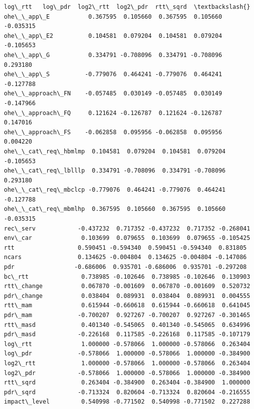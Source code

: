 \documentclass[11pt]{article}
\begin{document}
\begin{tcolorbox}[breakable, size=fbox, boxrule=.5pt, pad at break*=1mm, opacityfill=0]
\begin{Verbatim}[commandchars=\\\{\}]
                      log\_rtt   log\_pdr  log2\_rtt  log2\_pdr  rtt\_sqrd  \textbackslash{}
ohe\_\_app\_E           0.367595  0.105660  0.367595  0.105660 -0.035315
ohe\_\_app\_E2          0.104581  0.079204  0.104581  0.079204 -0.105653
ohe\_\_app\_G           0.334791 -0.708096  0.334791 -0.708096  0.293180
ohe\_\_app\_S          -0.779076  0.464241 -0.779076  0.464241 -0.127788
ohe\_\_approach\_FN    -0.057485  0.030149 -0.057485  0.030149 -0.147966
ohe\_\_approach\_FQ     0.121624 -0.126787  0.121624 -0.126787  0.147016
ohe\_\_approach\_FS    -0.062858  0.095956 -0.062858  0.095956  0.004220
ohe\_\_cat\_req\_hbmlmp  0.104581  0.079204  0.104581  0.079204 -0.105653
ohe\_\_cat\_req\_lblllp  0.334791 -0.708096  0.334791 -0.708096  0.293180
ohe\_\_cat\_req\_mbclcp -0.779076  0.464241 -0.779076  0.464241 -0.127788
ohe\_\_cat\_req\_mbmlhp  0.367595  0.105660  0.367595  0.105660 -0.035315
rec\_serv            -0.437232  0.717352 -0.437232  0.717352 -0.268041
env\_car              0.103699  0.079655  0.103699  0.079655 -0.105425
rtt                  0.590451 -0.594340  0.590451 -0.594340  0.831805
ncars                0.134625 -0.004804  0.134625 -0.004804 -0.147086
pdr                 -0.686006  0.935701 -0.686006  0.935701 -0.297208
bc\_rtt               0.738985 -0.102646  0.738985 -0.102646  0.130903
rtt\_change           0.067870 -0.001609  0.067870 -0.001609  0.520732
pdr\_change           0.038404  0.089931  0.038404  0.089931  0.004555
rtt\_mam              0.615944 -0.660618  0.615944 -0.660618  0.641045
pdr\_mam             -0.700207  0.927267 -0.700207  0.927267 -0.301465
rtt\_masd             0.401340 -0.545065  0.401340 -0.545065  0.634996
pdr\_masd            -0.226168  0.117585 -0.226168  0.117585 -0.107179
log\_rtt              1.000000 -0.578066  1.000000 -0.578066  0.263404
log\_pdr             -0.578066  1.000000 -0.578066  1.000000 -0.384900
log2\_rtt             1.000000 -0.578066  1.000000 -0.578066  0.263404
log2\_pdr            -0.578066  1.000000 -0.578066  1.000000 -0.384900
rtt\_sqrd             0.263404 -0.384900  0.263404 -0.384900  1.000000
pdr\_sqrd            -0.713324  0.820604 -0.713324  0.820604 -0.216555
impact\_level         0.540998 -0.771502  0.540998 -0.771502  0.227288


\end{Verbatim}
\end{tcolorbox}
\end{document}
